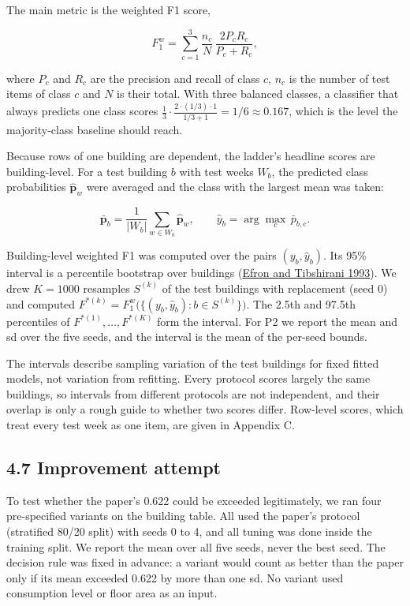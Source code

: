 \documentclass[
  10pt,
]{article}
\begin{document}
The main metric is the weighted F1 score,

\[F_1^{w} = \sum_{c=1}^{3} \frac{n_c}{N}\,\frac{2P_cR_c}{P_c+R_c},\]

where \(P_c\) and \(R_c\) are the precision and recall of class \(c\),
\(n_c\) is the number of test items of class \(c\) and \(N\) is their
total. With three balanced classes, a classifier that always predicts
one class scores
\(\tfrac{1}{3}\cdot\tfrac{2\cdot(1/3)\cdot 1}{1/3+1} = 1/6 \approx 0.167\),
which is the level the majority-class baseline should reach.

Because rows of one building are dependent, the ladder's headline scores
are building-level. For a test building \(b\) with test weeks \(W_b\),
the predicted class probabilities \(\hat{\mathbf{p}}_w\) were averaged
and the class with the largest mean was taken:

\[\bar{\mathbf{p}}_b = \frac{1}{|W_b|}\sum_{w \in W_b}\hat{\mathbf{p}}_w, \qquad \hat{y}_b = \arg\max_{c}\,\bar{p}_{b,c}.\]

Building-level weighted F1 was computed over the pairs
\((y_b, \hat{y}_b)\). Its 95\% interval is a percentile bootstrap over
buildings (\protect\hyperlink{ref-efron1993}{Efron and Tibshirani
1993}). We drew \(K = 1000\) resamples \(S^{(k)}\) of the test buildings
with replacement (seed 0) and computed
\(F^{*(k)} = F_1^{w}\big(\{(y_b,\hat{y}_b) : b \in S^{(k)}\}\big)\). The
2.5th and 97.5th percentiles of \(F^{*(1)},\dots,F^{*(K)}\) form the
interval. For P2 we report the mean and sd over the five seeds, and the
interval is the mean of the per-seed bounds.

The intervals describe sampling variation of the test buildings for
fixed fitted models, not variation from refitting. Every protocol scores
largely the same buildings, so intervals from different protocols are
not independent, and their overlap is only a rough guide to whether two
scores differ. Row-level scores, which treat every test week as one
item, are given in Appendix C.

\hypertarget{improvement-attempt}{%
\subsection{4.7 Improvement attempt}\label{improvement-attempt}}

To test whether the paper's 0.622 could be exceeded legitimately, we ran
four pre-specified variants on the building table. All used the paper's
protocol (stratified 80/20 split) with seeds 0 to 4, and all tuning was
done inside the training split. We report the mean over all five seeds,
never the best seed. The decision rule was fixed in advance: a variant
would count as better than the paper only if its mean exceeded 0.622 by
more than one sd. No variant used consumption level or floor area as an
input.
\end{document}
